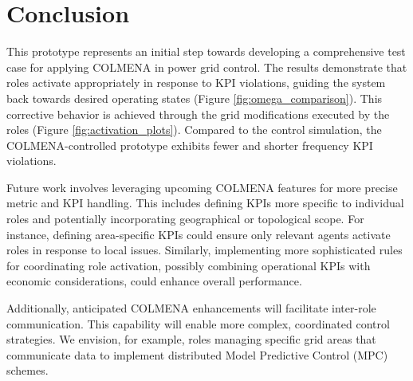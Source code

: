 \documentclass{article}
\begin{document}
\section{Conclusion}

This prototype represents an initial step towards developing a comprehensive test case for applying COLMENA in power grid control. The results demonstrate that roles activate appropriately in response to KPI violations, guiding the system back towards desired operating states (Figure \ref{fig:omega_comparison}). This corrective behavior is achieved through the grid modifications executed by the roles (Figure \ref{fig:activation_plots}). Compared to the control simulation, the COLMENA-controlled prototype exhibits fewer and shorter frequency KPI violations.

Future work involves leveraging upcoming COLMENA features for more precise metric and KPI handling. This includes defining KPIs more specific to individual roles and potentially incorporating geographical or topological scope. For instance, defining area-specific KPIs could ensure only relevant agents activate roles in response to local issues. Similarly, implementing more sophisticated rules for coordinating role activation, possibly combining operational KPIs with economic considerations, could enhance overall performance.

Additionally, anticipated COLMENA enhancements will facilitate inter-role communication. This capability will enable more complex, coordinated control strategies. We envision, for example, roles managing specific grid areas that communicate data to implement distributed Model Predictive Control (MPC) schemes. 
\nocite{*}
\printbibliography
\end{document}
